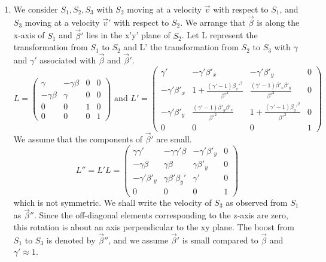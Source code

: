 \documentclass{article}
\begin{document}
\begin{enumerate}
		\item We consider $S_1, S_2, S_3$ with $S_2$ moving at a velocity $\vec{v}$ with respect to $S_1$, and $S_3$ moving at a velocity $\vec{v}'$ with respect to $S_2$. We arrange that $\vec{\beta}$ is along the x-axis of $S_1$ and $\vec{\beta}'$ lies in the x'y' plane of $S_2$.
		Let L represent the transformation from $S_1$ to $S_2$ and L' the transformation from $S_2$ to $S_3$ with $\gamma$ and $\gamma'$ associated with $\vec{\beta}$ and $\vec{\beta}'$.
		\[ L = 
		\begin{pmatrix}
			\gamma & -\gamma\beta & 0 & 0 \\
			-\gamma\beta & \gamma & 0 & 0 \\
			0 & 0 & 1 & 0 \\
			0 & 0 & 0 & 1
		\end{pmatrix}
		\text{ and }
		L' = 
		\begin{pmatrix}
			\gamma' & -\gamma'\beta'_x & -\gamma'\beta'_y & 0 \\
			-\gamma'\beta'_x & 1+\frac{(\gamma'-1)\beta_x'^2}{\beta'^2} & \frac{(\gamma'-1)\beta'_x\beta'_y}{\beta'^2} & 0 \\
			-\gamma'\beta'_y & \frac{(\gamma'-1)\beta'_y\beta'_x}{\beta'^2} & 1+\frac{(\gamma'-1)\beta_y'^2}{\beta'^2} & 0 \\
			0 & 0 & 0 & 1
		\end{pmatrix}
		\]
		We assume that the components of $\vec{\beta}'$ are small.
		\[ L'' = L'L = 
		\begin{pmatrix}
			\gamma\gamma' & -\gamma\gamma'\beta & -\gamma'\beta'_y & 0 \\
			-\gamma\beta & \gamma\beta & \gamma\beta'_y & 0 \\
			-\gamma'\beta'_y & \gamma\beta'\beta_y' & \gamma' & 0 \\
			0 & 0 & 0 & 1
		\end{pmatrix}
		\]
		which is not symmetric. We shall write the velocity of $S_3$ as observed from $S_1$ as $\vec{\beta}''$. Since the off-diagonal elements corresponding to the z-axis are zero, this rotation is about an axis perpendicular to the xy plane. The boost from $S_1$ to $S_3$ is denoted by $\vec{\beta}''$, and we assume $\vec{\beta}'$ is small compared to $\vec{\beta}$ and $\gamma' \approx 1$.
		

\end{enumerate}
\end{document}

